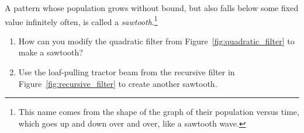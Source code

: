 \begin{multicols}{2}
\begin{problem}
	\end{problem}
	
	
	\mfilbreak
	
	
	\begin{problem}\label{exer:sawtooth} 
		A pattern whose population grows without bound, but also falls below some fixed value infinitely often, is called a \emph{sawtooth}.\footnote{This name comes from the shape of the graph of their population versus time, which goes up and down over and over, like a sawtooth wave.}\smallskip
		
		\begin{enumerate}[label=\bf\color{ocre}(\alph*)]
			\item How can you modify the quadratic filter from Figure~\ref{fig:quadratic_filter} to make a sawtooth?
			
			\item Use the loaf-pulling tractor beam from the recursive filter in Figure~\ref{fig:recursive_filter} to create another sawtooth.
		\end{enumerate}
	\end{problem}
	
	
\end{multicols}
\normalsize\vspace*{0.01cm}

